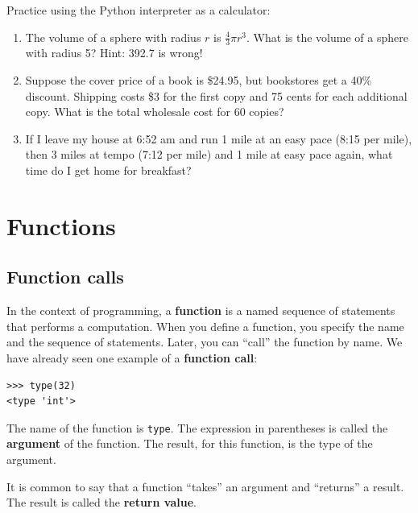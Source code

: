 \documentclass[10pt]{book}
\begin{document}
\begin{exercise}

Practice using the Python interpreter as a calculator: 

\begin{enumerate}

\item The volume of a sphere with radius $r$ is $\frac{4}{3} \pi r^3$.
  What is the volume of a sphere with radius 5?  Hint: 392.7 is wrong!

\item Suppose the cover price of a book is \$24.95, but bookstores get a
  40\% discount.  Shipping costs \$3 for the first copy and 75 cents
  for each additional copy.  What is the total wholesale cost for
  60 copies?

\item If I leave my house at 6:52 am and run 1 mile at an easy pace
  (8:15 per mile), then 3 miles at tempo (7:12 per mile) and 1 mile at
  easy pace again, what time do I get home for breakfast?

\end{enumerate}
\end{exercise}


\chapter{Functions}
\label{funcchap}

\section{Function calls}
\label{functionchap}

In the context of programming, a {\bf function} is a named sequence of
statements that performs a computation.  When you define a function,
you specify the name and the sequence of statements.  Later, you can
``call'' the function by name.  
We have already seen one example of a {\bf function call}:

\begin{verbatim}
>>> type(32)
<type 'int'>
\end{verbatim}
%
The name of the function is {\tt type}.  The expression in parentheses
is called the {\bf argument} of the function.  The result, for this
function, is the type of the argument.

It is common to say that a function ``takes'' an argument and ``returns''
a result.  The result is called the {\bf return value}.
\end{document}

